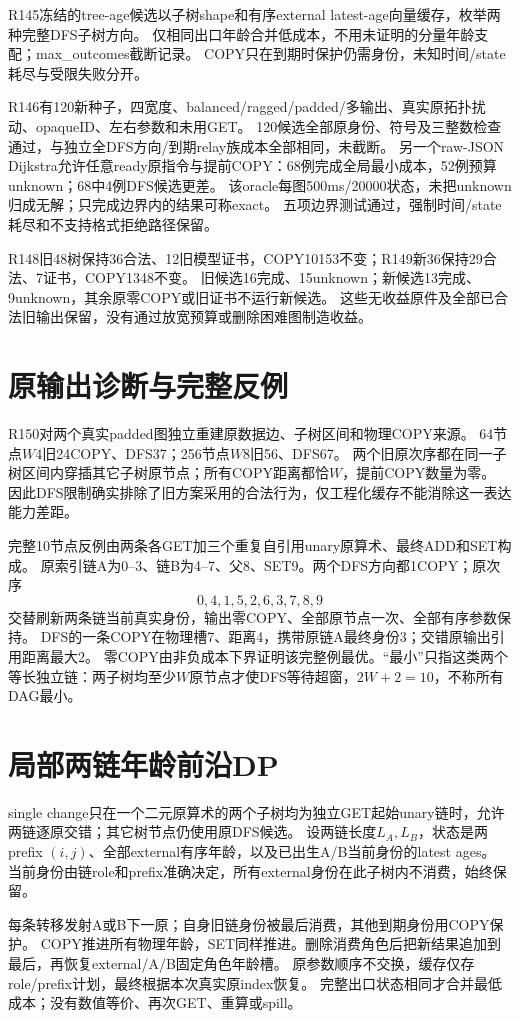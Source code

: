 \documentclass[UTF8,11pt,a4paper]{ctexart}
\begin{document}
R145冻结的tree-age候选以子树shape和有序external latest-age向量缓存，枚举两种完整DFS子树方向。
仅相同出口年龄合并低成本，不用未证明的分量年龄支配；max\_outcomes截断记录。
COPY只在到期时保护仍需身份，未知时间/state耗尽与受限失败分开。

R146有120新种子，四宽度、balanced/ragged/padded/多输出、真实原拓扑扰动、opaqueID、左右参数和未用GET。
120候选全部原身份、符号及三整数检查通过，与独立全DFS方向/到期relay族成本全部相同，未截断。
另一个raw-JSON Dijkstra允许任意ready原指令与提前COPY：68例完成全局最小成本，52例预算unknown；68中4例DFS候选更差。
该oracle每图500ms/20000状态，未把unknown归成无解；只完成边界内的结果可称exact。
五项边界测试通过，强制时间/state耗尽和不支持格式拒绝路径保留。

R148旧48树保持36合法、12旧模型证书，COPY10153不变；R149新36保持29合法、7证书，COPY1348不变。
旧候选16完成、15unknown；新候选13完成、9unknown，其余原零COPY或旧证书不运行新候选。
这些无收益原件及全部已合法旧输出保留，没有通过放宽预算或删除困难图制造收益。

\section{原输出诊断与完整反例}
R150对两个真实padded图独立重建原数据边、子树区间和物理COPY来源。
64节点$W4$旧24COPY、DFS37；256节点$W8$旧56、DFS67。
两个旧原次序都在同一子树区间内穿插其它子树原节点；所有COPY距离都恰$W$，提前COPY数量为零。
因此DFS限制确实排除了旧方案采用的合法行为，仅工程化缓存不能消除这一表达能力差距。

完整10节点反例由两条各GET加三个重复自引用unary原算术、最终ADD和SET构成。
原索引链A为0--3、链B为4--7、父8、SET9。两个DFS方向都1COPY；原次序
\[0,4,1,5,2,6,3,7,8,9\]
交替刷新两条链当前真实身份，输出零COPY、全部原节点一次、全部有序参数保持。
DFS的一条COPY在物理槽7、距离4，携带原链A最终身份3；交错原输出引用距离最大2。
零COPY由非负成本下界证明该完整例最优。“最小”只指这类两个等长独立链：两子树均至少$W$原节点才使DFS等待超窗，$2W+2=10$，不称所有DAG最小。

\section{局部两链年龄前沿DP}
single change只在一个二元原算术的两个子树均为独立GET起始unary链时，允许两链逐原交错；其它树节点仍使用原DFS候选。
设两链长度$L_A,L_B$，状态是两prefix $(i,j)$、全部external有序年龄，以及已出生A/B当前身份的latest ages。
当前身份由链role和prefix准确决定，所有external身份在此子树内不消费，始终保留。

每条转移发射A或B下一原；自身旧链身份被最后消费，其他到期身份用COPY保护。
COPY推进所有物理年龄，SET同样推进。删除消费角色后把新结果追加到最后，再恢复external/A/B固定角色年龄槽。
原参数顺序不交换，缓存仅存role/prefix计划，最终根据本次真实原index恢复。
完整出口状态相同才合并最低成本；没有数值等价、再次GET、重算或spill。
\end{document}
